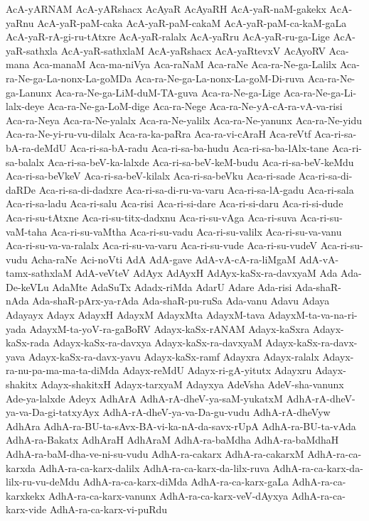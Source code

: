 {AcA-yARNAM
AcA-yARshacx
AcAyaR
AcAyaRH
AcA-yaR-naM-gakekx
AcA-yaRnu
AcA-yaR-paM-caka
AcA-yaR-paM-cakaM
AcA-yaR-paM-ca-kaM-gaLa
AcA-yaR-rA-gi-ru-tAtxre
AcA-yaR-ralalx
AcA-yaRru
AcA-yaR-ru-ga-Lige
AcA-yaR-sathxla
AcA-yaR-sathxlaM
AcA-yaRshacx
AcA-yaRtevxV
AcAyoRV
Aca-mana
Aca-manaM
Aca-ma-niVya
Aca-raNaM
Aca-raNe
Aca-ra-Ne-ga-Lalilx
Aca-ra-Ne-ga-La-nonx-La-goMDa
Aca-ra-Ne-ga-La-nonx-La-goM-Di-ruva
Aca-ra-Ne-ga-Lanunx
Aca-ra-Ne-ga-LiM-duM-TA-guva
Aca-ra-Ne-ga-Lige
Aca-ra-Ne-ga-Li-lalx-deye
Aca-ra-Ne-ga-LoM-dige
Aca-ra-Nege
Aca-ra-Ne-yA-cA-ra-vA-va-risi
Aca-ra-Neya
Aca-ra-Ne-yalalx
Aca-ra-Ne-yalilx
Aca-ra-Ne-yanunx
Aca-ra-Ne-yidu
Aca-ra-Ne-yi-ru-vu-dilalx
Aca-ra-ka-paRra
Aca-ra-vi-cAraH
Aca-reVtf
Aca-ri-sa-bA-ra-deMdU
Aca-ri-sa-bA-radu
Aca-ri-sa-ba-hudu
Aca-ri-sa-ba-lAlx-tane
Aca-ri-sa-balalx
Aca-ri-sa-beV-ka-lalxde
Aca-ri-sa-beV-keM-budu
Aca-ri-sa-beV-keMdu
Aca-ri-sa-beVkeV
Aca-ri-sa-beV-kilalx
Aca-ri-sa-beVku
Aca-ri-sade
Aca-ri-sa-di-daRDe
Aca-ri-sa-di-dadxre
Aca-ri-sa-di-ru-va-varu
Aca-ri-sa-lA-gadu
Aca-ri-sala
Aca-ri-sa-ladu
Aca-ri-salu
Aca-risi
Aca-ri-si-dare
Aca-ri-si-daru
Aca-ri-si-dude
Aca-ri-su-tAtxne
Aca-ri-su-titx-dadxnu
Aca-ri-su-vAga
Aca-ri-suva
Aca-ri-su-vaM-taha
Aca-ri-su-vaMtha
Aca-ri-su-vadu
Aca-ri-su-valilx
Aca-ri-su-va-vanu
Aca-ri-su-va-va-ralalx
Aca-ri-su-va-varu
Aca-ri-su-vude
Aca-ri-su-vudeV
Aca-ri-su-vudu
Acha-raNe
Aci-noVti
AdA
AdA-gave
AdA-vA-cA-ra-liMgaM
AdA-vA-tamx-sathxlaM
AdA-veVteV
AdAyx
AdAyxH
AdAyx-kaSx-ra-davxyaM
Ada
Ada-De-keVLu
AdaMte
AdaSuTx
Adadx-riMda
AdarU
Adare
Ada-risi
Ada-shaR-nAda
Ada-shaR-pArx-ya-rAda
Ada-shaR-pu-ruSa
Ada-vanu
Adavu
Adaya
Adayayx
Adayx
AdayxH
AdayxM
AdayxMta
AdayxM-tava
AdayxM-ta-va-na-ri-yada
AdayxM-ta-yoV-ra-gaBoRV
Adayx-kaSx-rANAM
Adayx-kaSxra
Adayx-kaSx-rada
Adayx-kaSx-ra-davxya
Adayx-kaSx-ra-davxyaM
Adayx-kaSx-ra-davx-yava
Adayx-kaSx-ra-davx-yavu
Adayx-kaSx-ramf
Adayxra
Adayx-ralalx
Adayx-ra-nu-pa-ma-ma-ta-diMda
Adayx-reMdU
Adayx-ri-gA-yitutx
Adayxru
Adayx-shakitx
Adayx-shakitxH
Adayx-tarxyaM
Adayxya
AdeVsha
AdeV-sha-vanunx
Ade-ya-lalxde
Adeyx
AdhArA
AdhA-rA-dheV-ya-saM-yukatxM
AdhA-rA-dheV-ya-va-Da-gi-tatxyAyx
AdhA-rA-dheV-ya-va-Da-gu-vudu
AdhA-rA-dheVyw
AdhAra
AdhA-ra-BU-ta-sAvx-BA-vi-ka-nA-da-savx-rUpA
AdhA-ra-BU-ta-vAda
AdhA-ra-Bakatx
AdhAraH
AdhAraM
AdhA-ra-baMdha
AdhA-ra-baMdhaH
AdhA-ra-baM-dha-ve-ni-su-vudu
AdhA-ra-cakarx
AdhA-ra-cakarxM
AdhA-ra-ca-karxda
AdhA-ra-ca-karx-dalilx
AdhA-ra-ca-karx-da-lilx-ruva
AdhA-ra-ca-karx-da-lilx-ru-vu-deMdu
AdhA-ra-ca-karx-diMda
AdhA-ra-ca-karx-gaLa
AdhA-ra-ca-karxkekx
AdhA-ra-ca-karx-vanunx
AdhA-ra-ca-karx-veV-dAyxya
AdhA-ra-ca-karx-vide
AdhA-ra-ca-karx-vi-puRdu
}
